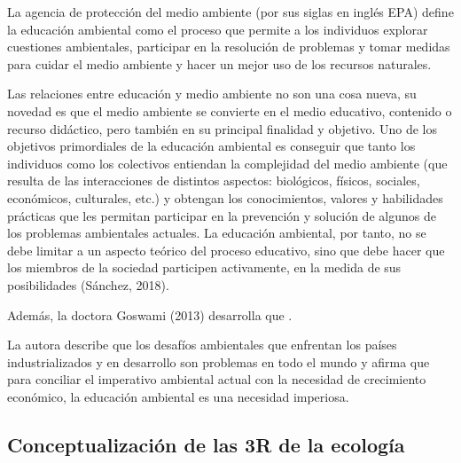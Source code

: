 La agencia de protección del medio ambiente (por sus siglas en inglés EPA) define la educación ambiental como el proceso que permite a los individuos explorar cuestiones ambientales, participar en la resolución de problemas y tomar medidas para cuidar el medio ambiente y hacer un mejor uso de los recursos naturales.

Las relaciones entre educación y medio ambiente no son una cosa nueva, su novedad es que el medio ambiente se convierte en el medio educativo, contenido o recurso didáctico, pero también en su principal finalidad y objetivo. Uno de los objetivos primordiales de la educación ambiental es conseguir que tanto los individuos como los colectivos entiendan la complejidad del medio ambiente (que resulta de las interacciones de distintos aspectos: biológicos, físicos, sociales, económicos, culturales, etc.) y obtengan los conocimientos, valores y habilidades prácticas que les permitan participar en la prevención y solución de algunos de los problemas ambientales actuales. La educación ambiental, por tanto, no se debe limitar a un aspecto teórico del proceso educativo, sino que debe hacer que los miembros de la sociedad participen activamente, en la medida de sus posibilidades (Sánchez, 2018).

Además, la doctora Goswami (2013) desarrolla que .

La autora describe que los desafíos ambientales que enfrentan los países industrializados y en desarrollo son problemas  en todo el mundo y afirma que para conciliar el imperativo ambiental actual con la necesidad de crecimiento económico, la educación ambiental es una necesidad imperiosa.

\subsection{Conceptualización de las 3R de la ecología}

